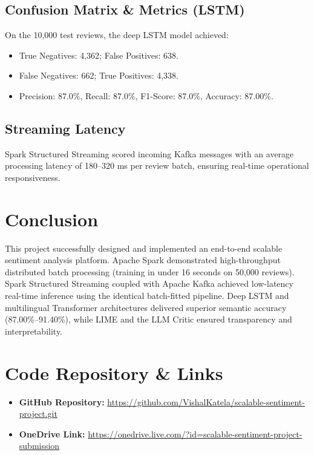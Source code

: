 \documentclass[conference]{IEEEtran}
\begin{document}
\subsection{Confusion Matrix \& Metrics (LSTM)}
On the 10,000 test reviews, the deep LSTM model achieved:
\begin{itemize}
    \item True Negatives: 4,362; False Positives: 638.
    \item False Negatives: 662; True Positives: 4,338.
    \item Precision: 87.0\%, Recall: 87.0\%, F1-Score: 87.0\%, Accuracy: 87.00\%.
\end{itemize}

\subsection{Streaming Latency}
Spark Structured Streaming scored incoming Kafka messages with an average processing latency of 180--320 ms per review batch, ensuring real-time operational responsiveness.

\section{Conclusion}
This project successfully designed and implemented an end-to-end scalable sentiment analysis platform. Apache Spark demonstrated high-throughput distributed batch processing (training in under 16 seconds on 50,000 reviews). Spark Structured Streaming coupled with Apache Kafka achieved low-latency real-time inference using the identical batch-fitted pipeline. Deep LSTM and multilingual Transformer architectures delivered superior semantic accuracy (87.00\%--91.40\%), while LIME and the LLM Critic ensured transparency and interpretability.

\section*{Code Repository \& Links}
\begin{itemize}
    \item \textbf{GitHub Repository:} \url{https://github.com/VishalKatela/scalable-sentiment-project.git}
    \item \textbf{OneDrive Link:} \url{https://onedrive.live.com/?id=scalable-sentiment-project-submission}
\end{itemize}
\end{document}
